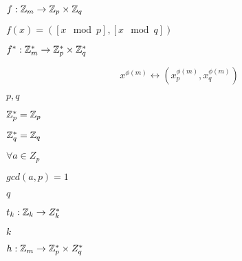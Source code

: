 \documentclass[10pt]{book}
\begin{document}
\begin{mdSnippets}
\begin{mdInlineSnippet}[993112e1bfa4a82f83df8b71e6e6d81a]
$f: \mathbb{Z}_m \to \mathbb{Z}_p \times \mathbb{Z}_q$\end{mdInlineSnippet}%
\begin{mdInlineSnippet}[f2a6c566ca0510df7fec2ae08f6a0c5d]%
$f(x) = ([x \mod p], [x \mod q])$\end{mdInlineSnippet}%
\begin{mdInlineSnippet}%
$f^*: \mathbb{Z}_m^* \to \mathbb{Z}_p^* \times \mathbb{Z}_q^*$\end{mdInlineSnippet}%
\begin{mdDisplaySnippet}[f3c6050f82b8a65b4492f0b80b99f0a6]%
\[%
x^{\phi(m)} \leftrightarrow (x_{p}^{\phi(m)}, x_{q}^{\phi(m)})
\]%
\end{mdDisplaySnippet}%
\begin{mdInlineSnippet}[c1753c36ab4eb582f1420d5178cb4bc5]%
$p,q$\end{mdInlineSnippet}%
\begin{mdInlineSnippet}[5e9d3324d1f9e30efba9e55084d49f62]%
$\mathbb{Z}_p^* = \mathbb{Z}_p$\end{mdInlineSnippet}%
\begin{mdInlineSnippet}[0df38252ac3e1022d36890e0bdaebffb]%
$\mathbb{Z}_q^* = \mathbb{Z}_q$\end{mdInlineSnippet}%
\begin{mdInlineSnippet}[0c0ba023e758af20b3863aaf4f9090eb]%
$\forall a \in Z_p$\end{mdInlineSnippet}%
\begin{mdInlineSnippet}%
$gcd(a,p) = 1$\end{mdInlineSnippet}%
\begin{mdInlineSnippet}[7694f4a66316e53c8cdd9d9954bd611d]%
$q$\end{mdInlineSnippet}%
\begin{mdInlineSnippet}%
$t_k: \mathbb{Z}_k \to Z_k^*$\end{mdInlineSnippet}%
\begin{mdInlineSnippet}[8ce4b16b22b58894aa86c421e8759df3]%
$k$\end{mdInlineSnippet}%
\begin{mdInlineSnippet}[6ad3e21c66716724583e6544b932818f]%
$h: \mathbb{Z}_m \to \mathbb{Z}^*_p \times Z^*_q$\end{mdInlineSnippet}%

\end{mdSnippets}
\end{document}
